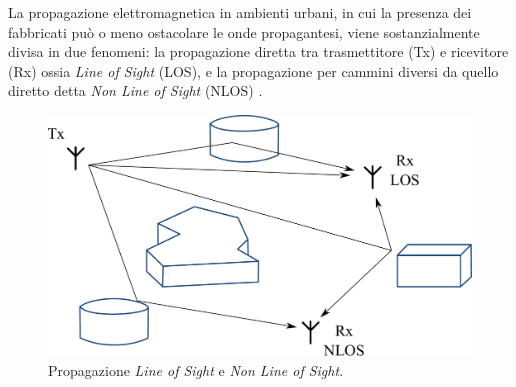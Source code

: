 \documentclass[technote]{IEEEtran}
\begin{document}
\par La propagazione elettromagnetica in ambienti urbani, in cui la presenza dei fabbricati può o meno ostacolare le onde propagantesi, viene sostanzialmente divisa in due fenomeni: la propagazione diretta tra trasmettitore (Tx) e ricevitore (Rx) ossia \textit{Line of Sight} (LOS), e la propagazione per cammini diversi da quello diretto detta \textit{Non Line of Sight} (NLOS) \cite{DeFlavis, ElZooghby}.
\begin{figure}[!ht]
\centering
\includegraphics[width=0.9\columnwidth]{figure1}
\caption{Propagazione \textit{Line of Sight} e \textit{Non Line of Sight}.}
\label{fig:1}
\end{figure}
\end{document}
